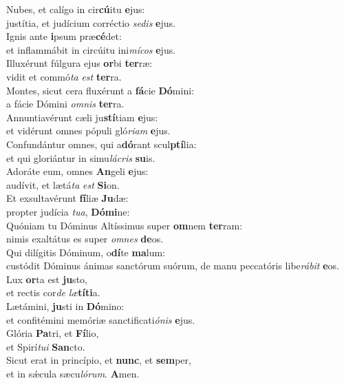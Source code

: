 \evenverse Nubes, et calígo in cir\textbf{cú}itu \textbf{e}jus:~\*\\
\evenverse justítia, et judícium corréctio \textit{se}\textit{dis} \textbf{e}jus.\\
\oddverse Ignis ante \textbf{i}psum præ\textbf{cé}det:~\*\\
\oddverse et inflammábit in circúitu ini\textit{mí}\textit{cos} \textbf{e}jus.\\
\evenverse Illuxérunt fúlgura ejus \textbf{or}bi \textbf{ter}ræ:~\*\\
\evenverse vidit et commó\textit{ta} \textit{est} \textbf{ter}ra.\\
\oddverse Montes, sicut cera fluxérunt a \textbf{fá}cie \textbf{Dó}mini:~\*\\
\oddverse a fácie Dómini \textit{om}\textit{nis} \textbf{ter}ra.\\
\evenverse Annuntiavérunt cæli ju\textbf{stí}tiam \textbf{e}jus:~\*\\
\evenverse et vidérunt omnes pópuli gló\textit{ri}\textit{am} \textbf{e}jus.\\
\oddverse Confundántur omnes, qui a\textbf{dó}rant scul\textbf{ptí}lia:~\*\\
\oddverse et qui gloriántur in simu\textit{lá}\textit{cris} \textbf{su}is.\\
\evenverse Adoráte eum, omnes \textbf{An}geli \textbf{e}jus:~\*\\
\evenverse audívit, et lætá\textit{ta} \textit{est} \textbf{Si}on.\\
\oddverse Et exsultavérunt \textbf{fí}liæ \textbf{Ju}dæ:~\*\\
\oddverse propter judícia \textit{tu}\textit{a}, \textbf{Dó}\textbf{mi}ne:\\
\evenverse Quóniam tu Dóminus Altíssimus super \textbf{om}nem \textbf{ter}ram:~\*\\
\evenverse nimis exaltátus es super \textit{om}\textit{nes} \textbf{de}os.\\
\oddverse Qui dilígitis Dóminum, o\textbf{dí}te \textbf{ma}lum:~\*\\
\oddverse custódit Dóminus ánimas sanctórum suórum, de manu peccatóris libe\textit{rá}\textit{bit} \textbf{e}os.\\
\evenverse Lux \textbf{or}ta est \textbf{ju}sto,~\*\\
\evenverse et rectis cor\textit{de} \textit{læ}\textbf{tí}\textbf{ti}a.\\
\oddverse Lætámini, \textbf{ju}sti in \textbf{Dó}mino:~\*\\
\oddverse et confitémini memóriæ sanctificati\textit{ó}\textit{nis} \textbf{e}jus.\\
\evenverse Glória \textbf{Pa}tri, et \textbf{Fí}lio,~\*\\
\evenverse et Spirí\textit{tu}\textit{i} \textbf{San}cto.\\
\oddverse Sicut erat in princípio, et \textbf{nunc}, et \textbf{sem}per,~\*\\
\oddverse et in sǽcula sæcu\textit{ló}\textit{rum}. \textbf{A}men.\\
